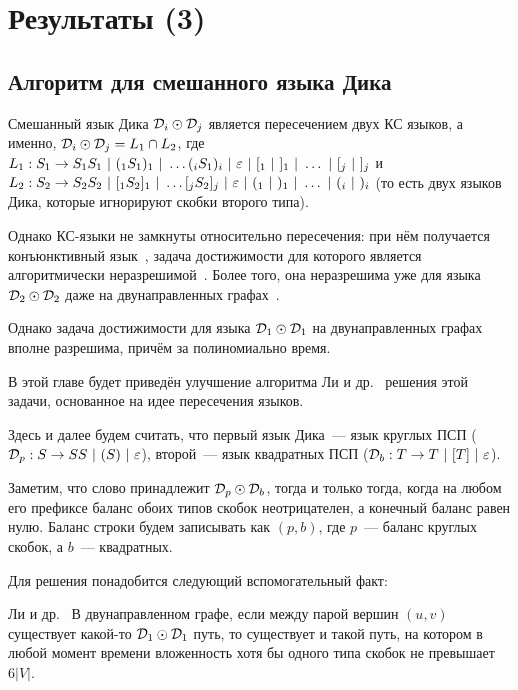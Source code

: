 \section{Результаты (3)}\label{section:dyck_1_1}

\subsection{Алгоритм для смешанного языка Дика}

Смешанный язык Дика $\mathcal{D}_i \odot \mathcal{D}_j$ является пересечением двух КС языков, а именно, 
$\mathcal{D}_i \odot \mathcal{D}_j = L_1 \cap L_2$, где 
$L_1 : S_1 \rightarrow S_1 S_1~|~(_1 S_1 )_1~|~ \dots (_i S_1 )_i ~|~ \varepsilon ~|~ [_1 ~|~ ]_1 ~|~ \dots ~|~ [_j ~|~ ]_j$ и 
$L_2 : S_2 \rightarrow S_2 S_2~|~[_1 S_2 ]_1~|~ \dots [_j S_2 ]_j ~|~ \varepsilon ~|~ (_1 ~|~ )_1 ~|~ \dots ~|~ (_i ~|~ )_i$ 
(то есть двух языков Дика, которые игнорируют скобки второго типа). 

Однако КС-языки не замкнуты относительно пересечения: при нём получается конъюнктивный язык~\cite{Okhotin01}, задача достижимости для которого является алгоритмически неразрешимой~\cite{Hellings14}. Более того, она неразрешима уже для языка $\mathcal{D}_2 \odot \mathcal{D}_2$ даже на двунаправленных графах~\cite{Li21}. 

Однако задача достижимости для языка $\mathcal{D}_1 \odot \mathcal{D}_1$ на двунаправленных графах вполне разрешима, причём за полиномиально время.

В этой главе будет приведён улучшение алгоритма Ли и др.~\cite{Li21} решения этой задачи, основанное на идее пересечения языков.

\begin{note}\label{fact:intersection}

  Здесь и далее будем считать, что первый язык Дика~--- язык круглых ПСП ($\mathcal{D}_p : S \rightarrow SS~|~(S)~|~\varepsilon$), второй~--- язык квадратных ПСП ($\mathcal{D}_b : T \rightarrow T~|~[T]~|~\varepsilon$).
\end{note}

Заметим, что слово принадлежит $\mathcal{D}_p \odot \mathcal{D}_b$, тогда и только тогда, когда на любом его префиксе баланс обоих типов скобок неотрицателен, а конечный баланс равен нулю. Баланс строки будем записывать как $(p, b)$, где $p$~--- баланс круглых скобок, а $b$~--- квадратных.

Для решения понадобится следующий вспомогательный факт:

\begin{lemma}{Ли и др.~\cite{Li21}}\label{lm:dyck_6v}
  В двунаправленном графе, если между парой вершин $(u, v)$ существует какой-то $\mathcal{D}_1 \odot \mathcal{D}_1$ путь, то существует и такой путь, на котором в любой момент времени вложенность хотя бы одного типа скобок не превышает $6 |V|$.
\end{lemma}

